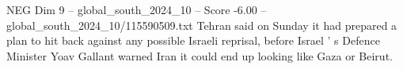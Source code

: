 \begin{textsample}{NEG Dim 9 – global\_south\_2024\_10 – Score -6.00 – global\_south\_2024\_10/115590509.txt}
Tehran said on Sunday it had prepared a plan to hit back against any possible Israeli reprisal, before Israel ' s Defence Minister Yoav Gallant warned Iran it could end up looking like Gaza or Beirut.

\end{textsample}
